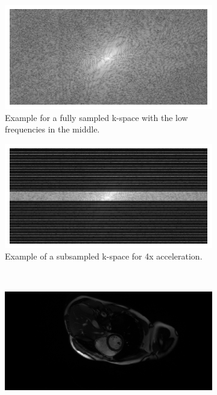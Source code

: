 \documentclass[english,version-2022-01]{uzl-thesis} %
\begin{document}
\begin{figure}[h]%
	\centering
	\graphicspath{{images/}{\main/images/}}
	\begin{subfigure}{0.45\textwidth}
    		\includegraphics[width=\textwidth]{k-space_fullysampled.png}
    		\caption{Example for a fully sampled k-space with the low frequencies in the middle.}
    		\label{fig:fullySampled}
	\end{subfigure}
	\hfill
	\begin{subfigure}{0.45\textwidth}
    		\includegraphics[width=\textwidth]{k-space_subsampled.png}
    		\caption{Example of a subsampled k-space for 4x acceleration.}
    		\label{fig:subSampled}
	\end{subfigure}\\
	\begin{subfigure}{0.45\textwidth}
    		\includegraphics[width=\textwidth]{image_fullysampled.png}

\end{subfigure}
\end{figure}
\end{document}
